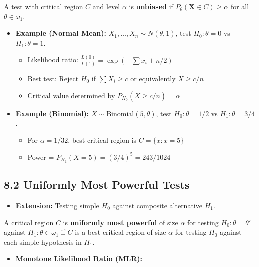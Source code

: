 \begin{definition}
A test with critical region $C$ and level $\alpha$ is \textbf{unbiased} if $P_\theta(\mathbf{X} \in C) \geq \alpha$ for all $\theta \in \omega_1$.
\end{definition}
\begin{itemize}
	\item \textbf{Example (Normal Mean):} $X_1, \ldots, X_n \sim N(\theta, 1)$, test $H_0: \theta = 0$ vs $H_1: \theta = 1$.
	\begin{itemize}
		\item Likelihood ratio: $\frac{L(0)}{L(1)} = \exp(-\sum x_i + n/2)$
		\item Best test: Reject $H_0$ if $\sum X_i \geq c$ or equivalently $\bar{X} \geq c/n$
		\item Critical value determined by $P_{H_0}(\bar{X} \geq c/n) = \alpha$
	\end{itemize}
	\item \textbf{Example (Binomial):} $X \sim \text{Binomial}(5, \theta)$, test $H_0: \theta = 1/2$ vs $H_1: \theta = 3/4$.
	\begin{itemize}
		\item For $\alpha = 1/32$, best critical region is $C = \{x: x = 5\}$
		\item Power = $P_{H_1}(X = 5) = (3/4)^5 = 243/1024$
	\end{itemize}
\end{itemize}

\subsection{8.2 Uniformly Most Powerful Tests}

\begin{itemize}
	\item \textbf{Extension:} Testing simple $H_0$ against composite alternative $H_1$.
\end{itemize}

\begin{definition}
A critical region $C$ is \textbf{uniformly most powerful} of size $\alpha$ for testing $H_0: \theta = \theta'$ against $H_1: \theta \in \omega_1$ if $C$ is a best critical region of size $\alpha$ for testing $H_0$ against each simple hypothesis in $H_1$.
\end{definition}
\begin{itemize}
	\item \textbf{Monotone Likelihood Ratio (MLR):}
\end{itemize}

